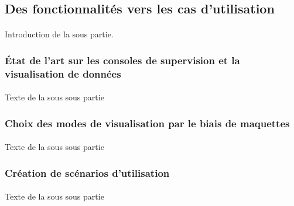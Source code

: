 	\subsection{Des fonctionnalités vers les cas d'utilisation}
		\paragraph{}
		Introduction de la sous partie.
		
		\subsubsection{État de l'art sur les consoles de supervision et la visualisation de données}
			\paragraph{}
			Texte de la sous sous partie
		\subsubsection{Choix des modes de visualisation par le biais de maquettes}
			\paragraph{}
			Texte de la sous sous partie
		\subsubsection{Création de scénarios d'utilisation}
			\paragraph{}
			Texte de la sous sous partie
